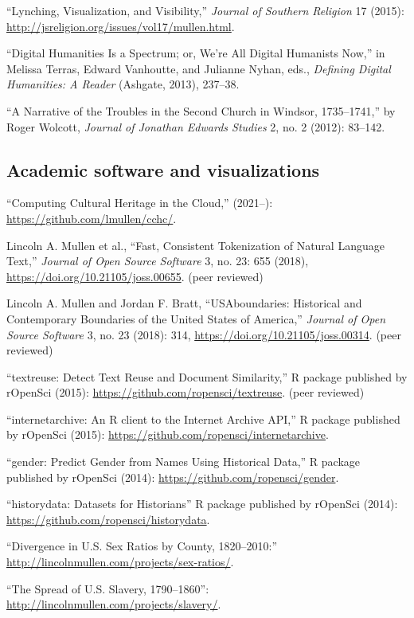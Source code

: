 \documentclass[11pt]{article}
\begin{document}
``Lynching, Visualization, and Visibility,'' \emph{Journal of Southern Religion} 17 (2015): \url{http://jsreligion.org/issues/vol17/mullen.html}.

``Digital Humanities Is a Spectrum; or, We're All Digital Humanists Now,'' in Melissa Terras, Edward Vanhoutte, and Julianne Nyhan, eds., \emph{Defining Digital Humanities: A Reader} (Ashgate, 2013), 237--38.

``A Narrative of the Troubles in the Second Church in Windsor, 1735--1741,'' by Roger Wolcott, \emph{Journal of Jonathan Edwards Studies} 2, no. 2 (2012): 83--142.

\subsection{Academic software and visualizations}\label{Academic software}

``Computing Cultural Heritage in the Cloud,'' (2021--): \url{https://github.com/lmullen/cchc/}.

Lincoln A. Mullen et al., ``Fast, Consistent Tokenization of Natural Language Text,'' \emph{Journal of Open Source Software} 3, no. 23: 655 (2018), \url{https://doi.org/10.21105/joss.00655}. (peer reviewed)

Lincoln A. Mullen and Jordan F. Bratt, ``USAboundaries: Historical and Contemporary Boundaries of the United States of America,'' \emph{Journal of Open Source Software} 3, no. 23 (2018): 314, \url{https://doi.org/10.21105/joss.00314}. (peer reviewed)

``textreuse: Detect Text Reuse and Document Similarity,'' R package published by rOpenSci (2015): \url{https://github.com/ropensci/textreuse}. (peer reviewed)

``internetarchive: An R client to the Internet Archive API,'' R package published by rOpenSci (2015): \url{https://github.com/ropensci/internetarchive}.

``gender: Predict Gender from Names Using Historical Data,'' R package published by rOpenSci (2014): \url{https://github.com/ropensci/gender}.

``historydata: Datasets for Historians'' R package published by rOpenSci (2014): \url{https://github.com/ropensci/historydata}.

``Divergence in U.S. Sex Ratios by County, 1820--2010:'' \url{http://lincolnmullen.com/projects/sex-ratios/}.

``The Spread of U.S.  Slavery, 1790--1860'':  \url{http://lincolnmullen.com/projects/slavery/}.
\end{document}
